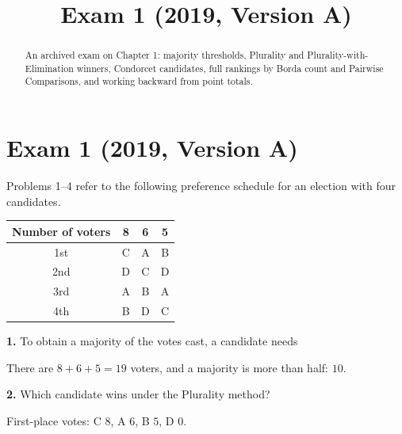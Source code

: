 \documentclass[12pt]{ximera}
\title{Exam 1 (2019, Version A)}
\begin{document}
\begin{abstract}
An archived exam on Chapter 1: majority thresholds, Plurality and
Plurality-with-Elimination winners, Condorcet candidates, full rankings by Borda count
and Pairwise Comparisons, and working backward from point totals.
\end{abstract}
\maketitle

\section*{Exam 1 (2019, Version A)}

\begin{problem}
Problems 1--4 refer to the following preference schedule for an election with four
candidates.
\begin{center}
\begin{tabular}{c|ccc}
Number of voters & 8 & 6 & 5\\\hline
1st & C & A & B\\
2nd & D & C & D\\
3rd & A & B & A\\
4th & B & D & C
\end{tabular}
\end{center}

\begin{prompt}
\textbf{1.} To obtain a majority of the votes cast, a candidate needs

\begin{multipleChoice}
\end{multipleChoice}

\begin{feedback}
There are $8+6+5=19$ voters, and a majority is more than half: $10$.
\end{feedback}
\end{prompt}

\begin{prompt}
\textbf{2.} Which candidate wins under the Plurality method?

\begin{multipleChoice}
\end{multipleChoice}

\begin{feedback}
First-place votes: C $8$, A $6$, B $5$, D $0$.
\end{feedback}
\end{prompt}


\end{problem}
\end{document}
